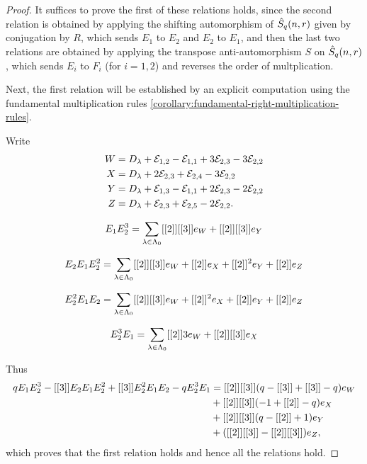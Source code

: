 \documentclass[a4paper, 11pt, twoside]{report}
\begin{document}
\begin{proof}
It suffices to prove the first of these relations holds, since the second relation is obtained by applying the shifting automorphism of $\hat{S}_q(n,r)$ given by conjugation by $R$, which sends $E_1$ to $E_2$ and $E_2$ to $E_1$, and then the last two relations are obtained by applying the transpose anti-automorphism $S$ on $\hat{S}_q(n,r)$, which sends $E_i$ to $F_i$ (for $i=1,2$) and reverses the order of multplication.

Next, the first relation will be established by an explicit computation using the fundamental multiplication rules \ref{corollary:fundamental-right-multiplication-rules}.

Write
\begin{align*}
W &= D_{\lambda} +\mathcal{E}_{1,2} -\mathcal{E}_{1,1} +3\mathcal{E}_{2,3} -3\mathcal{E}_{2,2}\\
X &= D_{\lambda} +2\mathcal{E}_{2,3} +\mathcal{E}_{2,4} -3\mathcal{E}_{2,2}\\
Y &= D_{\lambda} +\mathcal{E}_{1,3} -\mathcal{E}_{1,1} +2\mathcal{E}_{2,3} -2\mathcal{E}_{2,2}\\
Z &= D_{\lambda} +\mathcal{E}_{2,3} +\mathcal{E}_{2,5} -2\mathcal{E}_{2,2}.
\end{align*}

\begin{equation*}
E_1 E_2^3 = \sum_{\lambda\in\Lambda_0{}} [[2]][[3]]e_W +[[2]][[3]]e_Y
\end{equation*}

\begin{equation*}
E_2 E_1 E_2^2 = \sum_{\lambda\in\Lambda_0{}} [[2]][[3]]e_W +[[2]]e_X +[[2]]^2e_Y + [[2]]e_Z
\end{equation*}

\begin{equation*}
E_2^2 E_1 E_2 = \sum_{\lambda\in\Lambda_0{}} [[2]][[3]]e_W +[[2]]^2e_X +[[2]]e_Y +[[2]]e_Z
\end{equation*}

\begin{equation*}
E_2^3 E_1 = \sum_{\lambda\in\Lambda_0{}} [[2]]{3}e_W +[[2]][[3]]e_X
\end{equation*}

Thus
\begin{align*}
qE_1 E_2^3 -[[3]]E_2E_1E_2^2 + [[3]]E_2^2E_1E_2 -qE_2^3E_1
&= [[2]][[3]](q -[[3]] +[[3]] -q)e_W\\
&+ [[2]][[3]](-1 +[[2]] -q)e_X\\
&+ [[2]][[3]](q -[[2]] +1)e_Y\\
&+ ([[2]][[3]]-[[2]][[3]])e_Z,
\end{align*}
which proves that the first relation holds and hence all the relations hold.
\end{proof}
\end{document}
